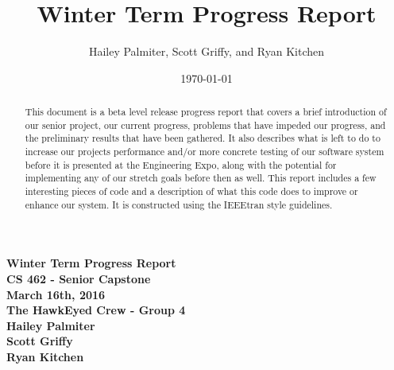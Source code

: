 \documentclass[letterpaper,10pt,titlepage]{IEEEtran}
\title{Winter Term Progress Report}
\author{Hailey Palmiter, Scott Griffy, and Ryan Kitchen}
\date{\today}
\begin{document}
   \begin{titlepage}
      \centering
      \vfill
      {\bfseries\Large
         Winter Term Progress Report \\
         CS 462 - Senior Capstone\\
         \vskip2cm
         March 16th, 2016\\
         \vskip2cm
         The HawkEyed Crew - Group 4\\ 
         \vskip1cm
         Hailey Palmiter\\
         \vskip1cm
         Scott Griffy\\
         \vskip1cm
         Ryan Kitchen\\
    
      }
      \vfill
      \vskip2cm
      \begin{abstract}
      This document is a beta level release progress report that covers a brief introduction of our senior project, our current progress, problems that have impeded our progress, and the preliminary results that have been gathered. It also describes what is left to do to increase our projects performance and/or more concrete testing of our software system before it is presented at the Engineering Expo, along with the potential for implementing any of our stretch goals before then as well. This report includes a few interesting pieces of code and a description of what this code does to improve or enhance our system. It is constructed using the IEEEtran style guidelines.
      \end{abstract}
      \vfill
   \end{titlepage}
   
   \onecolumn
   \tableofcontents
   \newpage
   \bigskip
\end{document}
